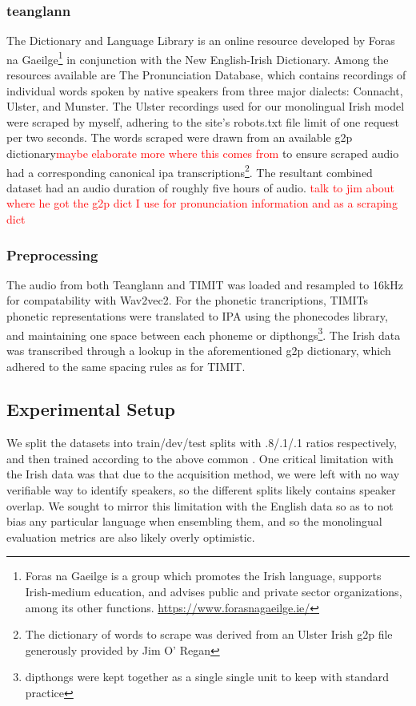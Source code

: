 \documentclass[thesis]{cluu}
\newcommand{\todo}[1]{\textcolor{red}{#1}}
\begin{document}
\subsubsection{teanglann}
The Dictionary and Language Library is an online resource developed by Foras na Gaeilge\footnote{Foras na Gaeilge is a group which promotes the Irish language, supports Irish-medium education, and advises public and private sector organizations, among its other functions. \url{https://www.forasnagaeilge.ie/}} in conjunction with the New English-Irish Dictionary. Among the resources available are The Pronunciation Database, which contains recordings of individual words spoken by native speakers from three major dialects: Connacht, Ulster, and Munster. The Ulster recordings used for our monolingual Irish model were scraped by myself, adhering to the site's robots.txt file limit of one request per two seconds. The words scraped were drawn from an available \gls{g2p} dictionary\todo{maybe elaborate more where this comes from} to ensure scraped audio had a corresponding canonical \gls{ipa} transcriptions\footnote{The dictionary of words to scrape was derived from an Ulster Irish \gls{g2p} file generously provided by Jim O' Regan}. The resultant combined dataset had an audio duration of roughly five hours of audio.
\todo{talk to jim about where he got the g2p dict I use for pronunciation information and as a scraping dict}

\subsubsection{Preprocessing}
The audio from both Teanglann and TIMIT was loaded and resampled to 16kHz for compatability with Wav2vec2. For the phonetic trancriptions, TIMITs phonetic representations were translated to IPA using the phonecodes library, and maintaining one space between each phoneme or dipthongs\footnote{dipthongs were kept together as a single single unit to keep with standard practice}. The Irish data was transcribed through a lookup in the aforementioned \gls{g2p} dictionary, which adhered to the same spacing rules as for TIMIT.

\subsection{Experimental Setup}
We split the datasets into train/dev/test splits with .8/.1/.1 ratios respectively, and then trained according to the above common . One critical limitation with the Irish data was that due to the acquisition method, we were left with no way verifiable way to identify speakers, so the different splits likely contains speaker overlap. We sought to mirror this limitation with the English data so as to not bias any particular language when ensembling them, and so the monolingual evaluation metrics are also likely overly optimistic. 
\end{document}

